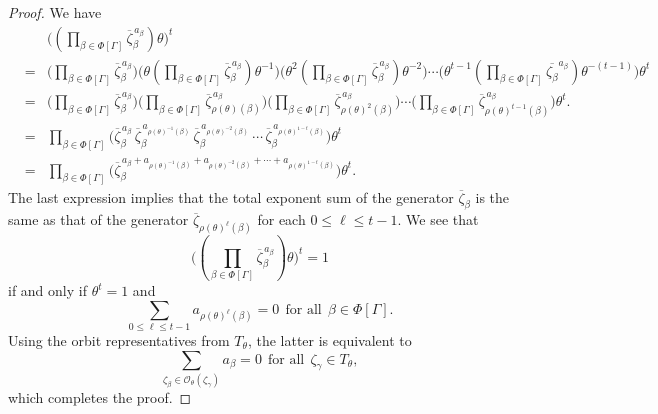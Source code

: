 \documentclass[12pt]{amsart}
\numberwithin{equation}{section}
\begin{document}
\begin{proof}
We have
\begin{eqnarray*}
& & \Bigg( (\prod_{\beta \in \Phi[\Gamma]} \overline{\zeta}_{\beta}^{\,a_\beta} ) \theta\Bigg)^t \\
&=& \Bigg(\prod_{\beta \in \Phi[\Gamma]} \overline{\zeta}_{\beta}^{\, a_\beta} \Bigg) \Bigg(  \theta (\prod_{\beta \in \Phi[\Gamma]} \overline{\zeta}_{\beta}^{\, a_\beta} ) \theta^{-1} \Bigg) \Bigg(\theta^2 (\prod_{\beta \in \Phi[\Gamma]} \overline{\zeta}_{\beta}^{\, a_\beta} )  \theta^{-2} \Bigg) \cdots \Bigg( \theta^{t-1} (\prod_{\beta \in \Phi[\Gamma]} \overline{\zeta_\beta}^{a_\beta} ) \theta^{-(t-1)} \Bigg) \theta^t \\
&=& \Bigg(\prod_{\beta \in \Phi[\Gamma]} \overline{\zeta}_{\beta}^{\,a_\beta} \Bigg) \Bigg(\prod_{\beta \in \Phi[\Gamma]} \overline{\zeta}_{{\rho(\theta)(\beta)}}^{\,a_\beta} \Bigg) \Bigg(\prod_{\beta \in \Phi[\Gamma]} \overline{\zeta}_{{\rho(\theta)^2(\beta)}}^{\,a_\beta} \Bigg) \cdots \Bigg( \prod_{\beta \in \Phi[\Gamma]} \overline{\zeta}_{{\rho(\theta)^{t-1}(\beta)}}^{\,a_\beta} \Bigg) \theta^t.\\
& =& \prod_{\beta \in \Phi[\Gamma]} \bigg(\overline{\zeta}_{\beta}^{\, a_\beta}\, \overline{\zeta}_{\beta}^{\, a_{\rho(\theta)^{-1}(\beta)}}\, \overline{\zeta}_{\beta}^{\,a_{\rho(\theta)^{-2}(\beta)}} \, \cdots \, \overline{\zeta}_{\beta}^{\,a_{\rho(\theta)^{1-t}(\beta)}}\bigg) \theta^t\\
& =& \prod_{\beta \in \Phi[\Gamma]} \bigg(\overline{\zeta}_{\beta}^{\, {a_\beta}+a_{\rho(\theta)^{-1}(\beta)}+a_{\rho(\theta)^{-2}(\beta)}+ \cdots +a_{\rho(\theta)^{1-t}(\beta)}}\bigg) \theta^t.
\end{eqnarray*}
The last expression implies that the total exponent sum of the generator $\overline{\zeta}_{\beta}$ is the same as that of the generator $\overline{\zeta}_{{\rho(\theta)^\ell(\beta)}}$ for each $0 \le \ell \le t-1$.  We see that 
$$\Bigg( (\prod_{\beta \in \Phi[\Gamma]} \overline{\zeta}_{\beta}^{\,a_\beta}) \theta \Bigg)^t=1$$
if and only if $\theta^t=1$ and
$$
\sum_{0 \le \ell \le t-1} a_{\rho(\theta)^\ell(\beta)}=0 ~~\text{for all}~~\beta \in \Phi[\Gamma].$$
Using the orbit representatives from $T_\theta$,  the latter is equivalent to 
$$\sum_{\zeta_\beta \in \mathcal{O}_\theta(\zeta_{\gamma})} a_\beta=0~~\text{for all}~~\zeta_{\gamma} \in T_\theta,
$$
which completes the proof.
\end{proof}
\end{document}
